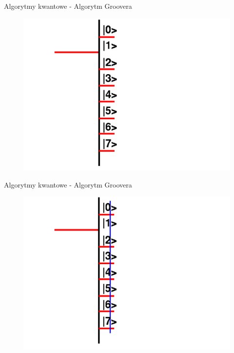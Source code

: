 \documentclass{beamer}
\begin{document}
	\begin{frame}{Algorytmy kwantowe - Algorytm Groovera}
		\vspace{0.5em}
		\begin{center}
			\begin{figure}
				\includegraphics[scale=0.35]{media/visualization5.png}
			\end{figure}
		\end{center}
		\vspace{0.5em}
	\end{frame}
	
	\begin{frame}{Algorytmy kwantowe - Algorytm Groovera}
		\vspace{0.5em}
		\begin{center}
			\begin{figure}
				\includegraphics[scale=0.28]{media/visualization6.png}
			\end{figure}
		\end{center}
		\vspace{0.5em}
	\end{frame}	
	
\end{document}
